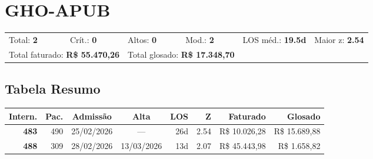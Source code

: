 \documentclass[a4paper,10pt]{article}
\begin{document}
\clearpage
\section{GHO-APUB}
\begin{tcolorbox}[colback=lightblue,colframe=jcubeblue,title={\textbf{Resumo --- GHO-APUB}}]
\begin{tabular}{ll@{\quad}ll@{\quad}ll}
Total: \textbf{2} &
Cr\'{i}t.: \textcolor{anomred}{\textbf{0}} &
Altos: \textcolor{anomorange}{\textbf{0}} &
Mod.: \textcolor{anomyellow}{\textbf{2}} &
LOS m\'{e}d.: \textbf{19.5d} &
Maior z: \textbf{2.54} \\

\multicolumn{2}{l}{Total faturado: \textbf{R\$ 55.470,26}} & 
\multicolumn{2}{l}{\textcolor{anomred}{Total glosado: \textbf{R\$ 17.348,70}}} & & \\

\end{tabular}
\end{tcolorbox}

\subsection{Tabela Resumo}
\begin{center}
\begin{longtable}{>{\scriptsize}r>{\scriptsize}r>{\scriptsize}c>{\scriptsize}c>{\scriptsize}r>{\scriptsize}r>{\scriptsize}r>{\scriptsize}r}
\toprule
\textbf{Intern.} & \textbf{Pac.} & \textbf{Admiss\~{a}o} & \textbf{Alta} & \textbf{LOS} & \textbf{Z} & \textbf{Faturado} & \textbf{Glosado} \\
\midrule
\endhead
\bottomrule
\endfoot

\textcolor{anomyellow}{\textbf{483}} & 490 & 25/02/2026 & — & 26d & \textcolor{anomyellow}{2.54} & R\$ 10.026,28 & \textcolor{anomred}{R\$ 15.689,88} \\

\textcolor{anomyellow}{\textbf{488}} & 309 & 28/02/2026 & 13/03/2026 & 13d & \textcolor{anomyellow}{2.07} & R\$ 45.443,98 & \textcolor{anomred}{R\$ 1.658,82} \\

\end{longtable}\end{center}
\end{document}
